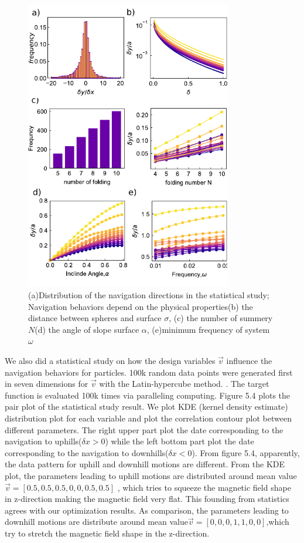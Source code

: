 \begin{figure}[p]
\centering
\includegraphics[width=9cm]{figures/5_5.pdf}
\caption{(a)Distribution of the navigation directions in the statistical study; Navigation behaviors depend on the physical properties(b) the distance between spheres and surface $\sigma$, (c) the number of summery $N$(d) the angle of slope surface $\alpha$, (e)minimum frequency of system  $\omega$ }
\label{fig:1}
\end{figure}


We also did a statistical study on how the design variables $\vec{v}$ influence the  navigation behaviors for particles. 100k random data points were generated first in seven dimensions for $\vec{v}$ with the Latin-hypercube method.\cite{park1994optimal} . The target function is evaluated 100k times via paralleling computing. Figure 5.4 plots the pair plot of the statistical study result. We plot KDE (kernel density estimate) distribution plot for each variable and plot the correlation contour plot between different parameters. The right upper part plot the date corresponding to the navigation to uphills($\delta x>0$) while the left bottom part plot the date corresponding to the navigation to downhills($\delta x<0$). From figure 5.4, apparently, the data pattern for uphill and downhill motions are different. From the KDE plot, the parameters leading to uphill motions are distributed around mean value$\vec{v}=[0.5,0.5,0.5,0,0,0.5,0.5]$  , which tries to squeeze the magnetic field shape in z-direction making the magnetic field  very flat. This founding from statistics agrees with our optimization results. As comparison, the parameters leading to downhill motions are distribute around mean value$\vec{v}=[0,0,0,1,1,0,0]$,which try to 
stretch the magnetic field shape in the z-direction.
 
